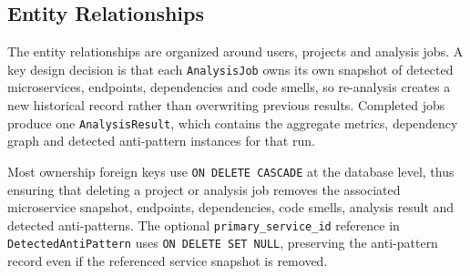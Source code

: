 \subsection{Entity Relationships}
\label{subsec:entity-relationships}

\par The entity relationships are organized around users, projects and analysis jobs. A key design decision is that each \texttt{AnalysisJob} owns its own snapshot of detected microservices, endpoints, dependencies and code smells, so re-analysis creates a new historical record rather than overwriting previous results. Completed jobs produce one \texttt{AnalysisResult}, which contains the aggregate metrics, dependency graph and detected anti-pattern instances for that run.

Most ownership foreign keys use \texttt{ON DELETE CASCADE} at the database level, thus ensuring that deleting a project or analysis job removes the associated microservice snapshot, endpoints, dependencies, code smells, analysis result and detected anti-patterns. The optional \texttt{primary\_service\_id} reference in \texttt{DetectedAntiPattern} uses \texttt{ON DELETE SET NULL}, preserving the anti-pattern record even if the referenced service snapshot is removed.



